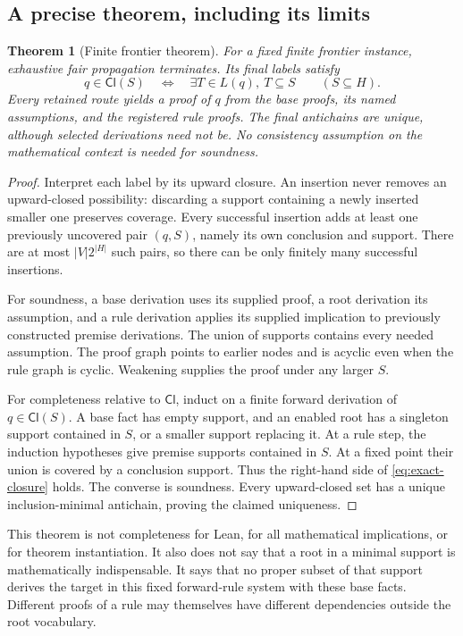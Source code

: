 \documentclass[11pt,a4paper]{article}
\newtheorem{theorem}{Theorem}[section]
\theoremstyle{definition}
\theoremstyle{remark}
\newcommand{\Cl}{\mathsf{Cl}}
\begin{document}
\subsection{A precise theorem, including its limits}
\begin{theorem}[Finite frontier theorem]\label{thm:frontier}
For a fixed finite frontier instance, exhaustive fair propagation terminates.
Its final labels satisfy
\begin{equation}\label{eq:exact-closure}
 q\in\Cl(S)\quad\Longleftrightarrow\quad
 \exists T\in L(q),\ T\subseteq S
 \qquad(S\subseteq H).
\end{equation}
Every retained route yields a proof of $q$ from the base proofs, its named
assumptions, and the registered rule proofs. The final antichains are unique,
although selected derivations need not be. No consistency assumption on the
mathematical context is needed for soundness.
\end{theorem}
\begin{proof}
Interpret each label by its upward closure. An insertion never removes an
upward-closed possibility: discarding a support containing a newly inserted
smaller one preserves coverage. Every successful insertion adds at least one
previously uncovered pair $(q,S)$, namely its own conclusion and support.
There are at most $|V|2^{|H|}$ such pairs, so there can be only finitely many
successful insertions.

For soundness, a base derivation uses its supplied proof, a root derivation its
assumption, and a rule derivation applies its supplied implication to previously
constructed premise derivations. The union of supports contains every needed
assumption. The proof graph points to earlier nodes and is acyclic even when
the rule graph is cyclic. Weakening supplies the proof under any larger $S$.

For completeness relative to $\Cl$, induct on a finite forward derivation of
$q\in\Cl(S)$. A base fact has empty support, and an enabled root has a singleton
support contained in $S$, or a smaller support replacing it. At a rule step,
the induction hypotheses give premise supports contained in $S$. At a fixed
point their union is covered by a conclusion support. Thus the right-hand side
of \eqref{eq:exact-closure} holds. The converse is soundness. Every upward-closed
set has a unique inclusion-minimal antichain, proving the claimed uniqueness.
\end{proof}

This theorem is not completeness for Lean, for all mathematical implications,
or for theorem instantiation. It also does not say that a root in a minimal
support is mathematically indispensable. It says that no proper subset of that
support derives the target in this fixed forward-rule system with these base
facts. Different proofs of a rule may themselves have different dependencies
outside the root vocabulary.
\end{document}
